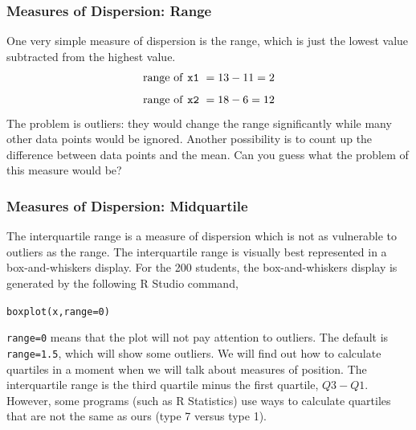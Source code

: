 \documentclass[xcolor=dvipsnames]{beamer}
\begin{document}
\begin{frame}
  \frametitle{Measures of Dispersion: Range}
One very simple measure of dispersion is the \alert{range}, which is
just the lowest value subtracted from the highest value. 
\begin{equation}
  \label{eq:ungoliex}
  \mbox{range of \texttt{x1} }=13-11=2
\end{equation}
\begin{equation}
  \label{eq:aengoore}
  \mbox{range of \texttt{x2} }=18-6=12
\end{equation}
The problem is outliers: they would change the range significantly
while many other data points would be ignored. Another possibility is
to count up the difference between data points and the mean. Can you
guess what the problem of this measure would be?
\end{frame}

\begin{frame}
  \frametitle{Measures of Dispersion: Midquartile}
The \alert{interquartile range} is a measure of dispersion which is not as
vulnerable to outliers as the range. The interquartile range is
visually best represented in a box-and-whiskers display. For the 200
students, the box-and-whiskers display is generated by the following R
Studio command,
\begin{alltt}
boxplot(x,range=0)
\end{alltt}
\texttt{range=0} means that the plot will not pay attention to
outliers. The default is \texttt{range=1.5}, which will show some
outliers. We will find out how to calculate quartiles in a moment when
we will talk about measures of position. The interquartile range is
the third quartile minus the first quartile, $Q3-Q1$. However, some
programs (such as R Statistics) use ways to calculate quartiles that
are not the same as ours (type 7 versus type 1). 
\end{frame}

\end{document}
